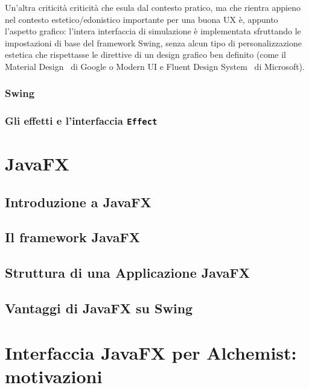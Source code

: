             Un'altra criticità criticità che esula dal contesto pratico, ma che rientra appieno nel contesto estetico/edonistico importante per una buona UX è, appunto l'aspetto grafico: l'intera interfaccia di simulazione è implementata sfruttando le impostazioni di base del framework Swing, senza alcun tipo di personalizzazione estetica che rispettasse le direttive di un design grafico ben definito (come il Material Design~\cite{material} di Google o Modern UI e Fluent Design System~\cite{fluent} di Microsoft).

            \subsubsection{Swing}\label{subsub:swing}
            \subsubsection{Gli effetti e l'interfaccia \texttt{Effect}}\label{subsub:effect}
    \section{JavaFX}\label{sec:jfx}
        \subsection{Introduzione a JavaFX}\label{sub:jfxIntro}
        \subsection{Il framework JavaFX}\label{sub:jfxFramework}
        \subsection{Struttura di una Applicazione JavaFX}\label{sub:jfxStruttura}
        \subsection{Vantaggi di JavaFX su Swing}\label{sub:jfxVantaggi}
    \section{Interfaccia JavaFX per Alchemist: motivazioni}\label{sec:motivi}
